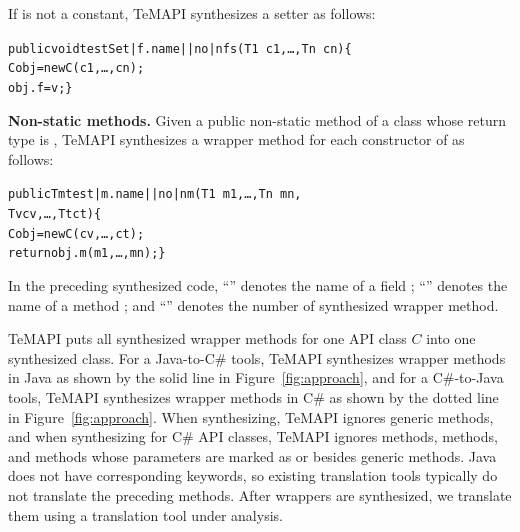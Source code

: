 If  is not a constant, TeMAPI synthesizes a setter as follows:

\begin{CodeOut}\vspace*{-1.5ex}
\begin{alltt}
 public void testSet|f.name||no|nfs(T1\ c1,\ldots, Tn\ cn)\{
   C obj = new C(c1,\ldots, cn);
   obj.f = v; \}
\end{alltt}
\end{CodeOut}\vspace*{-1.5ex}

\textbf{Non-static methods.} Given a public non-static method  of a class  whose return type is , TeMAPI synthesizes a wrapper method for each constructor  of  as follows:

\begin{CodeOut}\vspace*{-1.5ex}
\begin{alltt}
 public Tm test|m.name||no|nm(T1\ m1,\ldots, Tn\ mn,
                            Tv cv, \ldots, Tt ct)\{
   C obj = new C(cv,\ldots, ct);
   return obj.m(m1,\ldots, mn); \}
\end{alltt}
\end{CodeOut}\vspace*{-1.5ex}

In the preceding synthesized code, ``'' denotes the name of a field ; ``'' denotes the name of a method ; and ``'' denotes the number of synthesized wrapper method.

TeMAPI puts all synthesized wrapper methods for one API class $C$ into one synthesized class. For a Java-to-C\# tools, TeMAPI synthesizes wrapper methods in Java as shown by the solid line in Figure~\ref{fig:approach}, and for a C\#-to-Java tools, TeMAPI synthesizes wrapper methods in C\# as shown by the dotted line in Figure~\ref{fig:approach}. When synthesizing, TeMAPI ignores generic methods, and when synthesizing for C\# API classes, TeMAPI ignores  methods,  methods, and methods whose parameters are marked as  or  besides generic methods. Java does not have corresponding keywords, so existing translation tools typically do not translate the preceding methods. After wrappers are synthesized, we translate them using a translation tool under analysis.

